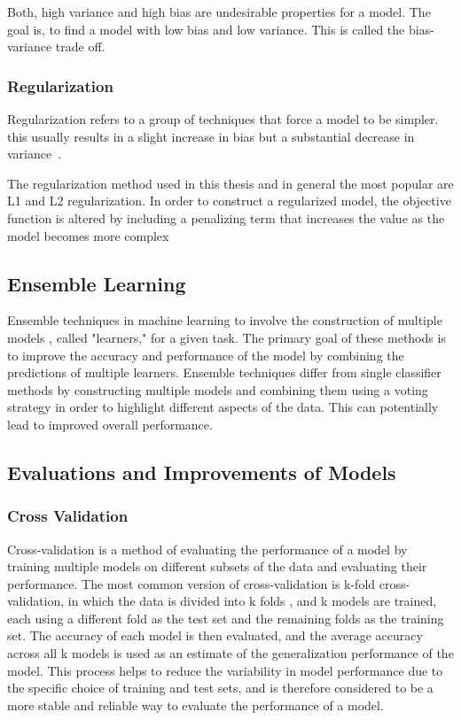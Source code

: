 Both, high variance and high bias are undesirable properties for a model. The goal is,
to find a
model with low bias and low variance. This is called the bias-variance trade off. \cite[p.
9]{neal_biasvariancetradeofftextbooks_2019}

\subsubsection*{Regularization}
Regularization refers to a group of techniques that force a model to be simpler.
this usually results in a slight increase in bias but a substantial decrease in
variance~\cite[p.
12]{burkov2019hundred}.

The regularization method used in this thesis and in general the most popular are L1
and L2
regularization.
In order to construct a regularized model, the objective function is altered by
including a
penalizing term that increases the value as the model becomes more complex~\cite[p.
12]{burkov2019hundred}

\subsection{Ensemble Learning}\label{subsec:ensemble-learning}
Ensemble techniques in machine learning to involve the construction of multiple models
, called
"learners," for a given task. The primary goal of these methods is to improve the
accuracy and
performance of the model by combining the predictions of multiple learners. Ensemble
techniques
differ from single classifier methods by constructing multiple models and combining
them using a
voting strategy in order to highlight different aspects of the data. This can
potentially lead to
improved overall performance. \cite[p. 253]{shaik_briefsurveyrandom_2019}

\subsection{Evaluations and Improvements of Models}

\subsubsection{Cross Validation}
Cross-validation is a method of evaluating the performance of a model by training
multiple models
on different subsets of the data and evaluating their performance. The most common
version of
cross-validation is k-fold cross-validation, in which the data is divided into k folds
, and k
models are trained, each using a different fold as the test set and the remaining folds
as the
training set.
The accuracy of each model is then evaluated, and the average accuracy across all k
models is
used as an estimate of the generalization performance of the model. This process helps
to reduce
the variability in model performance due to the specific choice of training and test
sets, and is
therefore considered to be a more stable and reliable way to evaluate the performance
of a model.
\cite[p. 252-260]{muller_introductionmachinelearning_2016}

